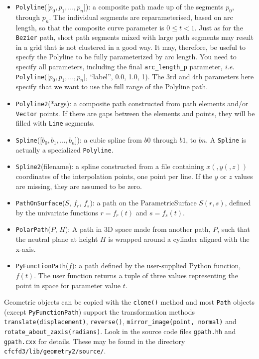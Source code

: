 \begin{itemize}
\item \texttt{Polyline}([$p_0, p_1, ..., p_n$]): a composite path made up of 
  the segments $p_0$, through $p_n$.
  The individual segments are reparameterised, based on arc length, so that
  the composite curve parameter is $0 \le t < 1$.
  Just as for the \verb!Bezier! path, short path segments mixed with large path segments may result in a grid
  that is not clustered in a good way.
  It may, therefore, be useful to specfy the Polyline to be fully parameterized by arc length.
  You need to specify all parameters, including the final \verb!arc_length_p! parameter, \textit{i.e.}
  \verb!Polyline!([$p_0, p_1, ..., p_n$], ``label'', 0.0, 1.0, 1).
  The 3rd and 4th parameters here specify that we want to use the full range of the Polyline path.
\item \texttt{Polyline2}(*args): a composite path constructed from path elements and/or \texttt{Vector} points.
  If there are gaps between the elements and points, 
  they will be filled with \texttt{Line} segments.
\item \texttt{Spline}([$b_0, b_1, ..., b_n$]): a cubic spline from $b0$ through
  $b1$, to $bn$.
  A \texttt{Spline} is actually a specialized \texttt{Polyline}.
\item \texttt{Spline2}(filename): a spline constructed from a file containing $x(,y(,z))$ coordinates
  of the interpolation points, one point per line.
  If the $y$ or $z$ values are missing, they are assumed to be zero.
\item \texttt{PathOnSurface}($S$, $f_r$, $f_s$): a path on the
  ParametricSurface $S(r,s)$, defined by the univariate functions 
  $r=f_r(t)$ and $s=f_s(t)$.
\item \texttt{PolarPath}($P$, $H$): A path in 3D space made from another path, $P$,
  such that the neutral plane at height $H$ is wrapped around a cylinder aligned with
  the x-axis.
\item \texttt{PyFunctionPath}($f$): a path defined by the user-supplied Python function, $f(t)$.
  The user function returns a tuple of three values representing the point in space 
  for parameter value $t$.
\end{itemize}

Geometric objects can be copied with the \texttt{clone()} method and
most \texttt{Path} objects (except \texttt{PyFunctionPath}) support the transformation methods
\texttt{translate(displacement)}, 
\texttt{reverse()}, 
\texttt{mirror\_image(point, normal)} and \\
\texttt{rotate\_about\_zaxis(radians)}.
Look in the source code files \texttt{gpath.hh} and \texttt{gpath.cxx} for details.
These may be found in the directory \texttt{cfcfd3/lib/geometry2/source/}.


